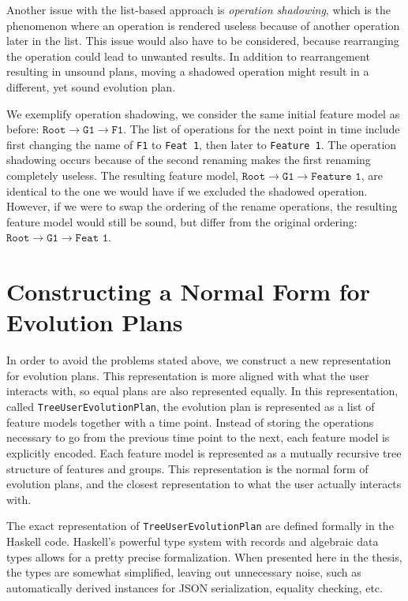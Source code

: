 \documentclass[a4paper,english]{ifimaster}
\begin{document}
Another issue with the list-based approach is \textit{operation shadowing}, which is the phenomenon where an operation is rendered useless because of another operation later in the list. This issue would also have to be considered, because rearranging the operation could lead to unwanted results. In addition to rearrangement resulting in unsound plans, moving a shadowed operation might result in a different, yet sound evolution plan.

We exemplify operation shadowing, we consider the same initial feature model as before: $\texttt{Root} \rightarrow \texttt{G1} \rightarrow \texttt{F1}$. The list of operations for the next point in time include first changing the name of \texttt{F1} to \texttt{Feat 1}, then later to \texttt{Feature 1}. The operation shadowing occurs because of the second renaming makes the first renaming completely useless. The resulting feature model, $\texttt{Root} \rightarrow \texttt{G1} \rightarrow \texttt{Feature 1}$, are identical to the one we would have if we excluded the shadowed operation. However, if we were to swap the ordering of the rename operations, the resulting feature model would still be sound, but differ from the original ordering: $\texttt{Root} \rightarrow \texttt{G1} \rightarrow \texttt{Feat 1}$.

\section{Constructing a Normal Form for Evolution Plans}%
\label{sec:constructing_a_normal_form_for_evolution_plans}

In order to avoid the problems stated above, we construct a new representation for evolution plans. This representation is more aligned with what the user interacts with, so equal plans are also represented equally. In this representation, called \texttt{TreeUserEvolutionPlan}, the evolution plan is represented as a list of feature models together with a time point. Instead of storing the operations necessary to go from the previous time point to the next, each feature model is explicitly encoded. Each feature model is represented as a mutually recursive tree structure of features and groups. This representation is the normal form of evolution plans, and the closest representation to what the user actually interacts with.

The exact representation of \texttt{TreeUserEvolutionPlan} are defined formally in the Haskell code. Haskell's powerful type system with records and algebraic data types allows for a pretty precise formalization. When presented here in the thesis, the types are somewhat simplified, leaving out unnecessary noise, such as automatically derived instances for JSON serialization, equality checking, etc.
\end{document}
